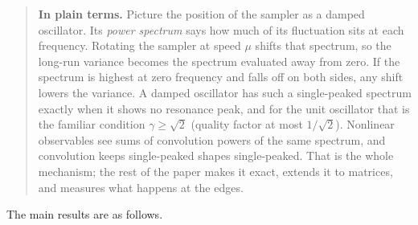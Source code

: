 \documentclass[
  british,
  11pt,
  a4paper,
]{article}
\begin{document}
\begin{quote}
\textbf{In plain terms.} Picture the position of the sampler as a damped
oscillator. Its \emph{power spectrum} says how much of its fluctuation
sits at each frequency. Rotating the sampler at speed \(\mu\) shifts
that spectrum, so the long-run variance becomes the spectrum evaluated
away from zero. If the spectrum is highest at zero frequency and falls
off on both sides, any shift lowers the variance. A damped oscillator
has such a single-peaked spectrum exactly when it shows no resonance
peak, and for the unit oscillator that is the familiar condition
\(\gamma\ge\sqrt2\) (quality factor at most \(1/\sqrt2\)). Nonlinear
observables see sums of convolution powers of the same spectrum, and
convolution keeps single-peaked shapes single-peaked. That is the whole
mechanism; the rest of the paper makes it exact, extends it to matrices,
and measures what happens at the edges.
\end{quote}

The main results are as follows.
\end{document}
